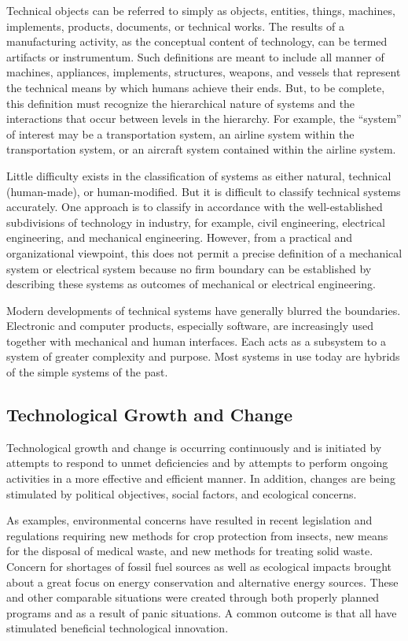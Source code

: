 Technical objects can be referred to simply as objects, entities, things, machines, implements, products, documents, or technical works. The results of a manufacturing activity, as the conceptual content of technology, can be termed artifacts or instrumentum. Such definitions are meant to include all manner of machines, appliances, implements, structures, weapons, and vessels that represent the technical means by which humans achieve their ends. But, to be complete, this definition must recognize the hierarchical nature of systems and the interactions that occur between levels in the hierarchy. For example, the ``system'' of interest may be a transportation system, an airline system within the transportation system, or an aircraft system contained within the airline system.

Little difficulty exists in the classification of systems as either natural, technical (human-made), or human-modified. But it is difficult to classify technical systems accurately. One approach is to classify in accordance with the well-established subdivisions of technology in industry, for example, civil engineering, electrical engineering, and mechanical engineering. However, from a practical and organizational viewpoint, this does not permit a precise definition of a mechanical system or electrical system because no firm boundary can be established by describing these systems as outcomes of mechanical or electrical engineering.

Modern developments of technical systems have generally blurred the boundaries. Electronic and computer products, especially software, are increasingly used together with mechanical and human interfaces. Each acts as a subsystem to a system of greater complexity and purpose. Most systems in use today are hybrids of the simple systems of the past.

\subsection{Technological Growth and Change}

Technological growth and change is occurring continuously and is initiated by attempts to respond to unmet deficiencies and by attempts to perform ongoing activities in a more effective and efficient manner. In addition, changes are being stimulated by political objectives, social factors, and ecological concerns.

As examples, environmental concerns have resulted in recent legislation and regulations requiring new methods for crop protection from insects, new means for the disposal of medical waste, and new methods for treating solid waste. Concern for shortages of fossil fuel sources as well as ecological impacts brought about a great focus on energy conservation and alternative energy sources. These and other comparable situations were created through both properly planned programs and as a result of panic situations. A common outcome is that all have stimulated beneficial technological innovation.

